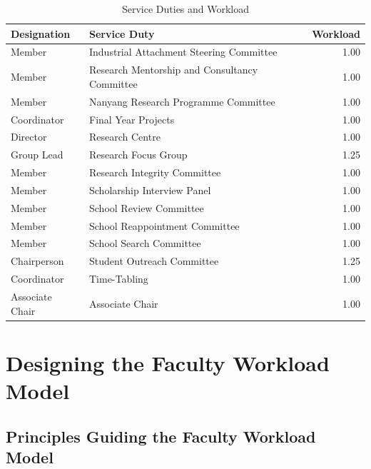 \begin{table}[htpb]
  \centering
  \begin{tabular}{|l | l | r |}
    \hline
    Designation     & Service Duty                                  & Workload \\
    \hline
    Member          & Industrial Attachment Steering Committee      & 1.00     \\
    Member          & Research Mentorship and Consultancy Committee & 1.00     \\
    Member          & Nanyang Research Programme Committee          & 1.00     \\
    Coordinator     & Final Year Projects                           & 1.00     \\
    Director        & Research Centre                               & 1.00     \\
    Group Lead      & Research Focus Group                          & 1.25     \\
    Member          & Research Integrity Committee                  & 1.00     \\
    Member          & Scholarship Interview Panel                   & 1.00     \\
    Member          & School Review Committee                       & 1.00     \\
    Member          & School Reappointment Committee                & 1.00     \\
    Member          & School Search Committee                       & 1.00     \\
    Chairperson     & Student Outreach Committee                    & 1.25     \\
    Coordinator     & Time-Tabling                                  & 1.00     \\
    Associate Chair & Associate Chair                               & 1.00     \\
    \hline
  \end{tabular}
  \caption{Service Duties and Workload}
  \label{tab:service_duties}
\end{table}

\section{Designing the Faculty Workload Model}

\subsection{Principles Guiding the Faculty Workload Model}
\label{sec:principles_guiding_workload_allocation_model}

